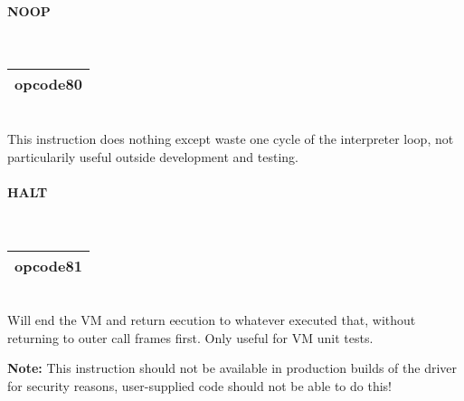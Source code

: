 \documentclass[12pt,a4paper]{article}
\begin{document}


\begin{minipage}{\textwidth}
\paragraph{NOOP}
~\vspace{1em}\\\begin{tabular}{|p{2cm}|}
\hline
opcode8\newline\textbf{0} \\
\hline
\end{tabular}\vspace{1em}\\
This instruction does nothing except waste one cycle of the interpreter loop, not particularily useful outside development and testing.
\end{minipage}

\vspace{2em}\begin{minipage}{\textwidth}
\paragraph{HALT}
~\vspace{1em}\\\begin{tabular}{|p{2cm}|}
\hline
opcode8\newline\textbf{1} \\
\hline
\end{tabular}\vspace{1em}\\
Will end the VM and return eecution to whatever executed that, without returning to outer call frames first. Only useful for VM unit tests.

\textbf{Note:} This instruction should not be available in production builds of the driver for security reasons, user-supplied code should not be able to do this!
\end{minipage}
\end{document}

